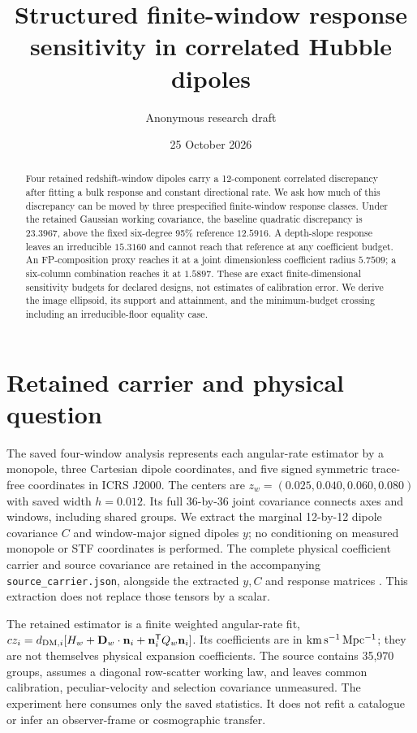 \documentclass[aps,prd,reprint,onecolumn,superscriptaddress,nofootinbib]{revtex4-2}
\begin{document}
\title{Structured finite-window response sensitivity in correlated Hubble dipoles}
\author{Anonymous research draft}
\noaffiliation
\date{25 October 2026}
\begin{abstract}
Four retained redshift-window dipoles carry a 12-component correlated discrepancy after fitting a bulk response and constant directional rate. We ask how much of this discrepancy can be moved by three prespecified finite-window response classes. Under the retained Gaussian working covariance, the baseline quadratic discrepancy is $23.3967$, above the fixed six-degree 95\% reference $12.5916$. A depth-slope response leaves an irreducible $15.3160$ and cannot reach that reference at any coefficient budget. An FP-composition proxy reaches it at a joint dimensionless coefficient radius $5.7509$; a six-column combination reaches it at $1.5897$. These are exact finite-dimensional sensitivity budgets for declared designs, not estimates of calibration error. We derive the image ellipsoid, its support and attainment, and the minimum-budget crossing including an irreducible-floor equality case.
\end{abstract}
\maketitle

\section{Retained carrier and physical question}

The saved four-window analysis represents each angular-rate estimator by a monopole, three Cartesian dipole coordinates, and five signed symmetric trace-free coordinates in ICRS J2000. The centers are $z_w=(0.025,0.040,0.060,0.080)$ with saved width $h=0.012$. Its full 36-by-36 joint covariance connects axes and windows, including shared groups. We extract the marginal 12-by-12 dipole covariance $C$ and window-major signed dipoles $y$; no conditioning on measured monopole or STF coordinates is performed. The complete physical coefficient carrier and source covariance are retained in the accompanying \texttt{source\_carrier.json}, alongside the extracted $y,C$ and response matrices \cite{h03,physical}. This extraction does not replace those tensors by a scalar.

The retained estimator is a finite weighted angular-rate fit, $cz_i=d_{{\rm DM},i}[H_w+\mathbf D_w\cdot\mathbf n_i+\mathbf n_i^{\mathsf T}Q_w\mathbf n_i]$. Its coefficients are in ${\rm km\,s^{-1}\,Mpc^{-1}}$; they are not themselves physical expansion coefficients. The source contains 35,970 groups, assumes a diagonal row-scatter working law, and leaves common calibration, peculiar-velocity and selection covariance unmeasured. The experiment here consumes only the saved statistics. It does not refit a catalogue or infer an observer-frame or cosmographic transfer.
\end{document}
